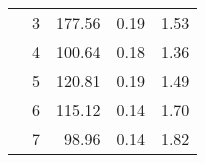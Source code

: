 \begin{tabular}{llrrr}
                                 & 3          & 177.56            & 0.19                      & 1.53              \\
                                 & 4          & 100.64            & 0.18                      & 1.36              \\
                                 & 5          & 120.81            & 0.19                      & 1.49              \\
                                 & 6          & 115.12            & 0.14                      & 1.70              \\
                                 & 7          & 98.96             & 0.14                      & 1.82              \\
\bottomrule
\end{tabular}

